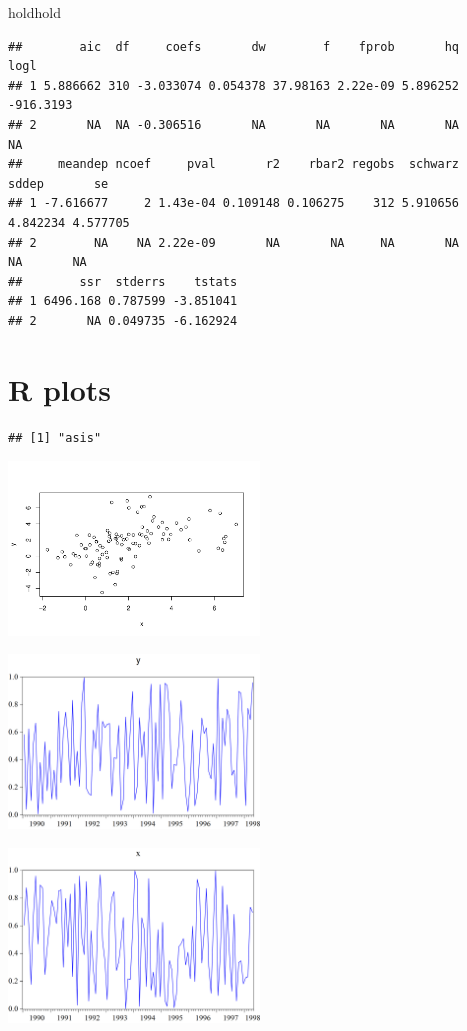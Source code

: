 \documentclass[
]{article}
\begin{document}
holdhold

\begin{verbatim}
##        aic  df     coefs       dw        f    fprob       hq      logl
## 1 5.886662 310 -3.033074 0.054378 37.98163 2.22e-09 5.896252 -916.3193
## 2       NA  NA -0.306516       NA       NA       NA       NA        NA
##     meandep ncoef     pval       r2    rbar2 regobs  schwarz    sddep       se
## 1 -7.616677     2 1.43e-04 0.109148 0.106275    312 5.910656 4.842234 4.577705
## 2        NA    NA 2.22e-09       NA       NA     NA       NA       NA       NA
##        ssr  stderrs    tstats
## 1 6496.168 0.787599 -3.851041
## 2       NA 0.049735 -6.162924
\end{verbatim}

\hypertarget{r-plots}{%
\section{R plots}\label{r-plots}}

\begin{verbatim}
## [1] "asis"
\end{verbatim}

\begin{center}\includegraphics[width=0.5\textwidth]{test_engEviews_files/figure-latex/label-1} \end{center}

\begin{center}\includegraphics[width=0.5\textwidth]{EViewsR_files/eview-graph-y} \end{center}

\begin{center}\includegraphics[width=0.5\textwidth]{EViewsR_files/eview-graph-x} \end{center}
\end{document}
